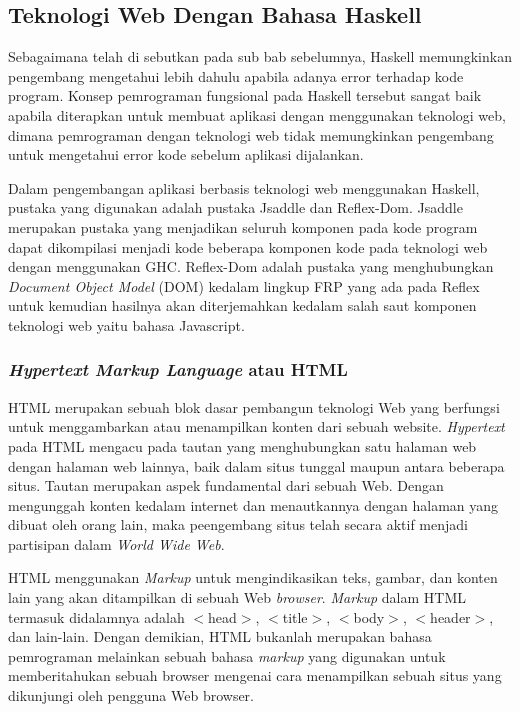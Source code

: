 \documentclass[pi.tex]{subfile}
\begin{document}
\subsection{Teknologi Web Dengan Bahasa Haskell}\hspace{5pt}
Sebagaimana telah di sebutkan pada sub bab sebelumnya, Haskell memungkinkan pengembang mengetahui lebih dahulu apabila adanya error terhadap kode program. Konsep pemrograman fungsional pada Haskell tersebut sangat baik apabila diterapkan untuk membuat aplikasi dengan menggunakan teknologi web, dimana pemrograman dengan teknologi web tidak memungkinkan pengembang untuk mengetahui error kode sebelum aplikasi dijalankan.

\hspace{5pt}Dalam pengembangan aplikasi berbasis teknologi web menggunakan Haskell, pustaka yang digunakan adalah pustaka Jsaddle dan Reflex-Dom. Jsaddle merupakan pustaka yang menjadikan seluruh komponen pada kode program dapat dikompilasi menjadi kode beberapa komponen kode pada teknologi web dengan menggunakan GHC. Reflex-Dom adalah pustaka yang menghubungkan \emph{Document Object Model} (DOM) kedalam lingkup FRP yang ada pada Reflex untuk kemudian hasilnya akan diterjemahkan kedalam salah saut komponen teknologi web yaitu bahasa Javascript.

\subsubsection{\emph{Hypertext Markup Language} atau HTML}\hspace{10pt}
HTML merupakan sebuah blok dasar pembangun teknologi Web yang berfungsi untuk menggambarkan atau menampilkan konten dari sebuah website. \emph{Hypertext} pada HTML mengacu pada tautan yang menghubungkan satu halaman web dengan halaman web lainnya, baik dalam situs tunggal maupun antara beberapa situs. Tautan merupakan aspek fundamental dari sebuah Web. Dengan mengunggah konten kedalam internet dan menautkannya dengan halaman yang dibuat oleh orang lain, maka peengembang situs telah secara aktif menjadi partisipan dalam \emph{World Wide Web}.

\hspace{10pt}HTML menggunakan \emph{Markup} untuk mengindikasikan teks, gambar, dan konten lain yang akan ditampilkan di sebuah Web \emph{browser}. \emph{Markup} dalam HTML termasuk didalamnya adalah $<$head$>$, $<$title$>$, $<$body$>$, $<$header$>$, dan lain-lain. Dengan demikian, HTML bukanlah merupakan bahasa pemrograman melainkan sebuah bahasa \emph{markup} yang digunakan untuk memberitahukan sebuah browser mengenai cara menampilkan sebuah situs yang dikunjungi oleh pengguna Web browser.
\end{document}

